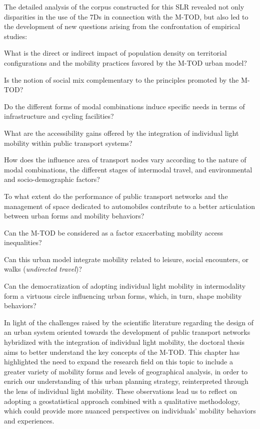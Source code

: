 \begin{refsegment}
The detailed analysis of the corpus constructed for this \acrshort{SLR} revealed not only disparities in the use of the \acrshort{7Ds} in connection with the \acrshort{M-TOD}, but also led to the development of new questions arising from the confrontation of empirical studies:
    \begin{customitemize}
\item What is the direct or indirect impact of population density on territorial configurations and the mobility practices favored by the \acrshort{M-TOD} urban model?
\item Is the notion of social mix complementary to the principles promoted by the \acrshort{M-TOD}?
\item Do the different forms of modal combinations induce specific needs in terms of infrastructure and cycling facilities?
\item What are the accessibility gains offered by the integration of individual light mobility within public transport systems?
\item How does the influence area of transport nodes vary according to the nature of modal combinations, the different stages of intermodal travel, and environmental and socio-demographic factors?
\item To what extent do the performance of public transport networks and the management of space dedicated to automobiles contribute to a better articulation between urban forms and mobility behaviors?
\item Can the \acrshort{M-TOD} be considered as a factor exacerbating mobility access inequalities?
\item Can this urban model integrate mobility related to leisure, social encounters, or walks (\textsl{undirected travel})?
\item Can the democratization of adopting individual light mobility in intermodality form a virtuous circle influencing urban forms, which, in turn, shape mobility behaviors?
    \end{customitemize}%

In light of the challenges raised by the scientific literature regarding the design of an urban system oriented towards the development of public transport networks hybridized with the integration of individual light mobility, the doctoral thesis aims to better understand the key concepts of the \acrshort{M-TOD}. This chapter has highlighted the need to expand the research field on this topic to include a greater variety of mobility forms and levels of geographical analysis, in order to enrich our understanding of this urban planning strategy, reinterpreted through the lens of individual light mobility. These observations lead us to reflect on adopting a geostatistical approach combined with a qualitative methodology, which could provide more nuanced perspectives on individuals' mobility behaviors and experiences.%


\end{refsegment}
